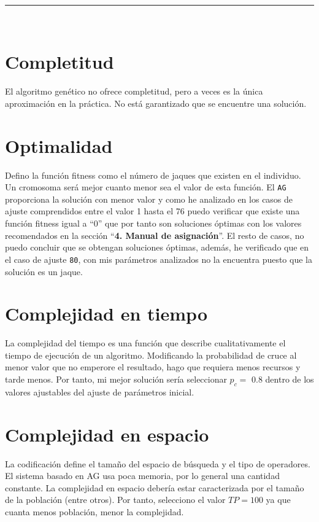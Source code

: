 \newpage
\begin{center}
	{\fboxrule=4pt } \\
	\setcounter{chapter}{6}
	\setcounter{section}{0}
	\rule{15cm}{0pt} \\
\end{center}

\section{Completitud}
El algoritmo genético no ofrece completitud, pero a veces es la única aproximación en la práctica.
No está garantizado que se encuentre una solución.

\section{Optimalidad}
\par Defino la función fitness como el número de jaques que existen en el individuo.
Un cromosoma será mejor cuanto menor sea el valor de esta función. El \texttt{AG} proporciona
la solución con menor valor y como he analizado en los casos de ajuste comprendidos
entre el valor 1 hasta el 76 puedo verificar que existe una función fitness igual a ``0''
que por tanto son soluciones óptimas con los valores recomendados en la sección
 ``\textbf{4. Manual de asignación}''. El resto de casos, no puedo concluir que se obtengan 
soluciones óptimas, además, he verificado que en el caso de ajuste \texttt{80}, con mis parámetros 
analizados no la encuentra puesto que la solución es un jaque.

\section{Complejidad en tiempo}
La complejidad del tiempo es una función que describe cualitativamente el tiempo de ejecución de un algoritmo. 
Modificando la probabilidad de cruce al menor valor que no emperore el resultado, 
hago que requiera menos recursos y tarde menos. Por tanto, mi mejor solución sería
seleccionar $p_c=$ 0.8 dentro de los valores ajustables del ajuste de parámetros inicial.

\section{Complejidad en espacio}
La codificación define el tamaño del espacio de búsqueda y el tipo de operadores. 
El sistema basado en AG usa poca memoria, por lo general una cantidad constante. 
La complejidad en espacio debería estar caracterizada por el tamaño de la población (entre otros). Por tanto,
selecciono el valor $TP=100$ ya que cuanta menos población, menor la complejidad.